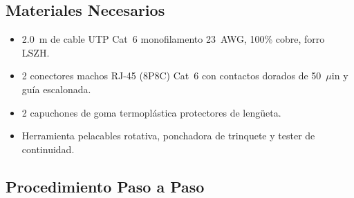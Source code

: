 \subsection{Materiales Necesarios}

\begin{itemize}[leftmargin=*]
    \item 2.0~m de cable UTP Cat~6 monofilamento 23~AWG, 100\% cobre, forro LSZH.
    \item 2 conectores machos RJ-45 (8P8C) Cat~6 con contactos dorados de 50~$\mu$in y guía escalonada.
    \item 2 capuchones de goma termoplástica protectores de lengüeta.
    \item Herramienta pelacables rotativa, ponchadora de trinquete y tester de continuidad.
\end{itemize}

\subsection{Procedimiento Paso a Paso}

